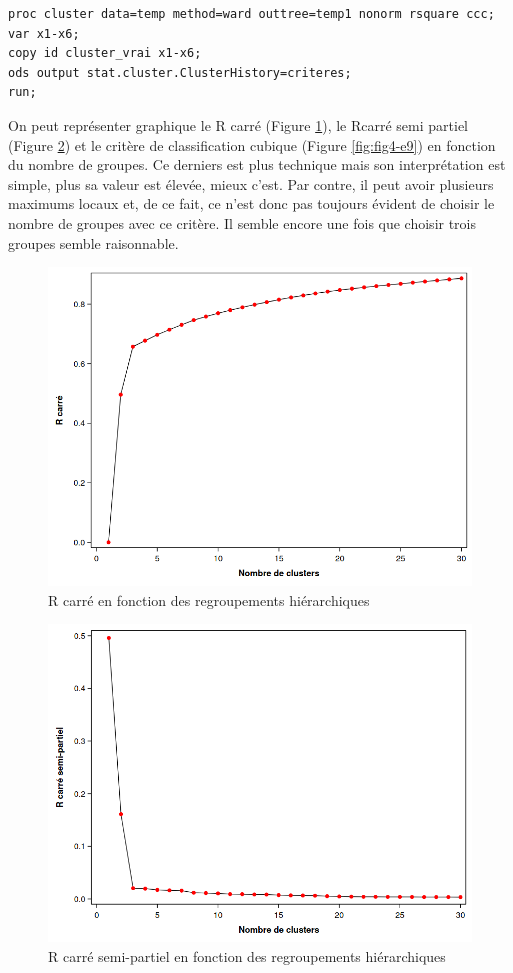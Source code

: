 \documentclass[
  11pt,
  letterpaper,
]{book}
\theoremstyle{definition}
\theoremstyle{definition}
\theoremstyle{definition}
\theoremstyle{remark}
\begin{document}
\begin{verbatim}
proc cluster data=temp method=ward outtree=temp1 nonorm rsquare ccc;
var x1-x6;
copy id cluster_vrai x1-x6;
ods output stat.cluster.ClusterHistory=criteres;
run;
\end{verbatim}

On peut représenter graphique le R carré (Figure \ref{fig:fig4-e7}), le Rcarré semi partiel (Figure \ref{fig:fig4-e8}) et le critère de classification cubique (Figure \ref{fig:fig4-e9}) en fonction du nombre de groupes. Ce derniers est plus technique mais son interprétation est simple, plus sa valeur est élevée, mieux c'est. Par contre, il peut avoir plusieurs maximums locaux et, de ce fait, ce n'est donc pas toujours évident de choisir le nombre de groupes avec ce critère. Il semble encore une fois que choisir trois groupes semble raisonnable.

\begin{figure}

{\centering \includegraphics[width=0.8\linewidth]{figures/04-clustering-e8} 

}

\caption{R carré en fonction des regroupements hiérarchiques}\label{fig:fig4-e7}
\end{figure}

\begin{figure}

{\centering \includegraphics[width=0.8\linewidth]{figures/04-clustering-e9} 

}

\caption{R carré semi-partiel en fonction des regroupements hiérarchiques}\label{fig:fig4-e8}
\end{figure}
\end{document}
